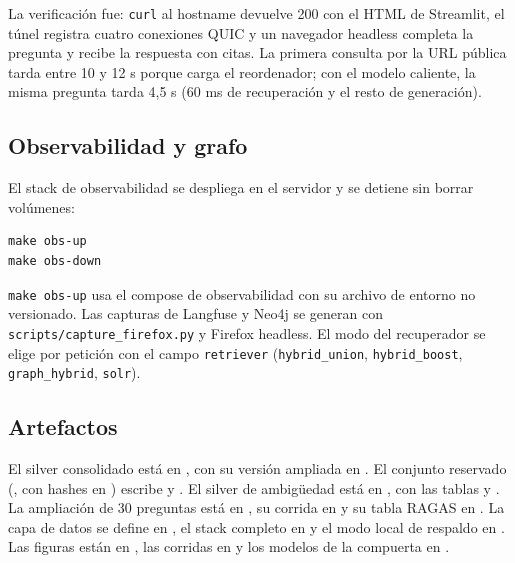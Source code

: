La verificaci\'on fue: \texttt{curl} al hostname devuelve 200 con el HTML de Streamlit, el t\'unel registra cuatro conexiones QUIC y un navegador headless completa la pregunta y recibe la respuesta con citas. La primera consulta por la URL p\'ublica tarda entre 10 y 12 s porque carga el reordenador; con el modelo caliente, la misma pregunta tarda 4,5 s (60 ms de recuperaci\'on y el resto de generaci\'on).

\subsection{Observabilidad y grafo}

El stack de observabilidad se despliega en el servidor y se detiene sin borrar vol\'umenes:

\begin{verbatim}
make obs-up
make obs-down
\end{verbatim}

\texttt{make obs-up} usa el compose de observabilidad con su archivo de entorno no versionado. Las capturas de Langfuse y Neo4j se generan con \texttt{scripts/capture\_firefox.py} y Firefox headless. El modo del recuperador se elige por petici\'on con el campo \texttt{retriever} (\texttt{hybrid\_union}, \texttt{hybrid\_boost}, \texttt{graph\_hybrid}, \texttt{solr}).

\subsection{Artefactos}

{\raggedright
El silver consolidado est\'a en , con su versi\'on ampliada en . El conjunto reservado (, con hashes en ) escribe  y . El silver de ambig\"uedad est\'a en , con las tablas  y . La ampliaci\'on de 30 preguntas est\'a en , su corrida en  y su tabla RAGAS en . La capa de datos se define en , el stack completo en  y el modo local de respaldo en . Las figuras est\'an en , las corridas en  y los modelos de la compuerta en .\par}

